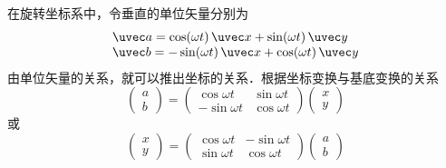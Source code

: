 ﻿在旋转坐标系中，令垂直的单位矢量分别为
\begin{equation}
\begin{array}{l}
\uvec a = \cos(\omega t)\,\uvec x + \sin (\omega t)\,\uvec y \\
\uvec b =  - \sin(\omega t)\,\uvec x + \cos(\omega t)\,\uvec y
\end{array}
\end{equation}
由单位矢量的关系，就可以推出坐标的关系．根据坐标变换与基底变换的关系 %
\begin{equation}\label{Corio_eq4}
\begin{pmatrix} a\\b \end{pmatrix} = 
\begin{pmatrix}
\cos\omega t & \sin\omega t\\
-\sin\omega t & \cos\omega t
\end{pmatrix}
\begin{pmatrix} x\\y \end{pmatrix}
\end{equation}
或
\begin{equation} \label{Corio_eq5}
\begin{pmatrix} x\\y \end{pmatrix} = 
\begin{pmatrix}
\cos\omega t & -\sin\omega t\\
\sin\omega t & \cos\omega t
\end{pmatrix}
\begin{pmatrix} a\\b \end{pmatrix}
\end{equation}